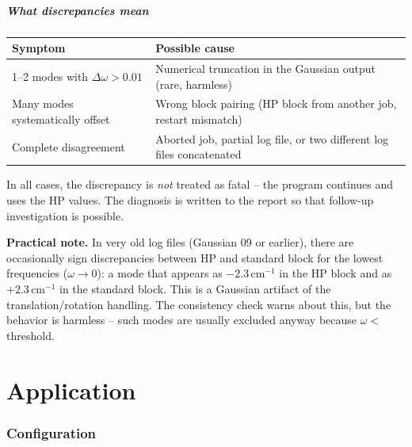 \documentclass[11pt,a4paper,twoside]{article}
\theoremstyle{remark}
\begin{document}
\subsubsection*{What discrepancies mean}

\begin{center}
\begin{tabularx}{\textwidth}{l X}
\toprule
\textbf{Symptom} & \textbf{Possible cause} \\
\midrule
1--2 modes with $\Delta\omega > 0.01$ &
  Numerical truncation in the Gaussian output (rare, harmless) \\
Many modes systematically offset &
  Wrong block pairing (HP block from another job, restart
  mismatch) \\
Complete disagreement &
  Aborted job, partial log file, or two different log files
  concatenated \\
\bottomrule
\end{tabularx}
\end{center}

In all cases, the discrepancy is \emph{not} treated as fatal --
the program continues and uses the HP values. The diagnosis is
written to the report so that follow-up investigation is possible.

\begin{warnbox}
\textbf{Practical note.} In very old log files (Gaussian 09 or
earlier), there are occasionally sign discrepancies between HP and
standard block for the lowest frequencies ($\omega \to 0$): a mode
that appears as $-2.3$\,cm$^{-1}$ in the HP block and as
$+2.3$\,cm$^{-1}$ in the standard block. This is a Gaussian
artifact of the translation/rotation handling. The consistency
check warns about this, but the behavior is harmless -- such modes
are usually excluded anyway because $\omega < $ threshold.
\end{warnbox}


\part{Application}

\section{Configuration}
\label{sec:konfig}
\end{document}
